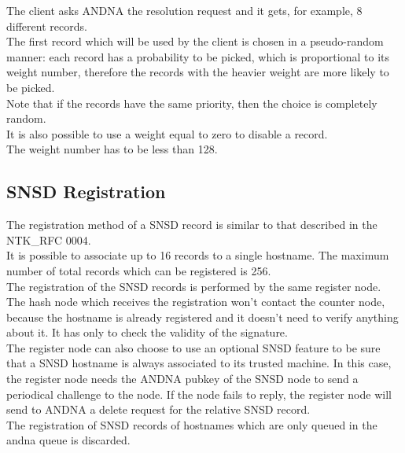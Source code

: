 \documentclass[a4paper]{article}
\begin{document}
The client asks ANDNA the resolution request and it gets, for example, 8
different records.\\
The first record which will be used by the client is chosen in a pseudo-random
manner: each record has a probability to be picked, which is proportional to its
weight number, therefore the records with the heavier weight are more likely to
be picked.\\
Note that if the records have the same priority, then the choice is completely
random.\\

It is also possible to use a weight equal to zero to disable a record.\\

The weight number has to be less than 128.\\

\subsection{SNSD Registration}

The registration method of a SNSD record is similar to that described in the
NTK\_RFC 0004.\\

It is possible to associate up to 16 records to a single hostname.
The maximum number of total records which can be registered is 256.\\

The registration of the SNSD records is performed by the same register node.
The hash node which receives the registration won't contact the counter node,
because the hostname is already registered and it doesn't need to verify
anything about it. It has only to check the validity of the signature.\\

The register node can also choose to use an optional SNSD feature to be sure
that a SNSD hostname is always associated to its trusted machine. In this
case, the register node needs the ANDNA pubkey of the SNSD node to send a
periodical challenge to the node.
If the node fails to reply, the register node will send to ANDNA a delete
request for the relative SNSD record.\\

The registration of SNSD records of hostnames which are only queued in the
andna queue is discarded.
\end{document}
